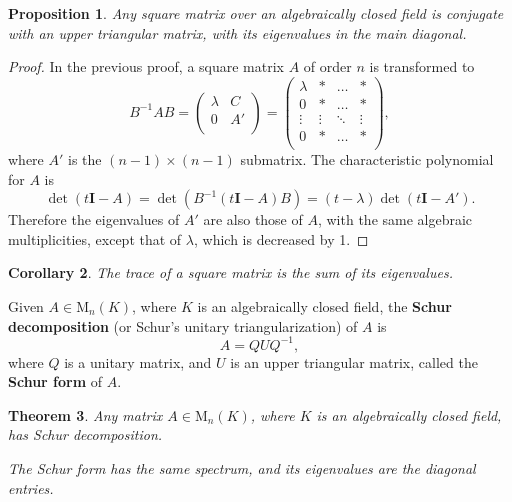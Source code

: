 \documentclass[12pt, letterpaper]{article}
\newcommand{\MM}{\mathrm{M}}
\newcommand{\idm}{\mathbf{I}}
\newtheorem{prop}{Proposition}[section]
\newtheorem{cor}[prop]{Corollary}
\newtheorem{thm}[prop]{Theorem}
\theoremstyle{definition}
\theoremstyle{remark}
\theoremstyle{definition}
\theoremstyle{plain}
\begin{document}
	
	\begin{prop}
		Any square matrix over an algebraically closed field is conjugate with an upper triangular matrix,
		with its eigenvalues in the main diagonal.
	\end{prop}
	\begin{proof}
		In the previous proof, a square matrix $A$ of order $n$ is transformed to
		\[
		B^{-1}AB=\begin{pmatrix}
			\lambda & C \\
			0 & A'\\
		\end{pmatrix}
		=
		\begin{pmatrix}
			\lambda & * & \dots & *\\
			0 & * & \dots & *\\
			\vdots & \vdots & \ddots & \vdots\\
			0 & * & \dots & *\\
		\end{pmatrix},
		\]
		where $A'$ is the $(n-1)\times(n-1)$ submatrix.
		The characteristic polynomial for $A$ is
		\[\det(t\idm-A)=\det(B^{-1}(t\idm-A)B)=(t-\lambda)\det(t\idm-A').\]
		Therefore the eigenvalues of $A'$ are also those of $A$, with the same algebraic multiplicities,
		except that of $\lambda$, which is decreased by 1.
	\end{proof}
	\begin{cor}
		The trace of a square matrix is the sum of its eigenvalues.
	\end{cor}
	\begin{def*}
		Given $A\in\MM_n(K)$, where $K$ is an algebraically closed field,
		the \textbf{Schur decomposition} (or Schur’s unitary triangularization) of $A$ is
		\[A=QUQ^{-1},\]
		where $Q$ is a unitary matrix,
		and $U$ is an upper triangular matrix, called the \textbf{Schur form} of $A$.
	\end{def*}
	\begin{thm}
		Any matrix $A\in\MM_n(K)$, where $K$ is an algebraically closed field,
		has Schur decomposition.
		
		The Schur form has the same spectrum, and its eigenvalues are the diagonal entries.
	\end{thm}
	
\end{document}
